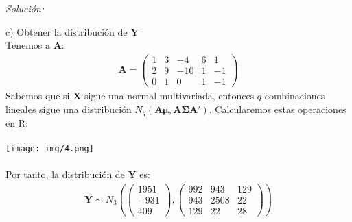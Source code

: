 \documentclass[12pt]{article}
\newenvironment{sol}
    {\emph{Solución:}
    }
    {
    }
\begin{document}
\begin{sol}
c) Obtener la distribución de $\mathbf{Y}$\\
Tenemos a $\mathbf{A}$:
\begin{align*} \mathbf{A} =
\begin{pmatrix}
1 & 3 & -4 & 6 & 1 \\
2 & 9 & -10 & 1 & -1\\
0 & 1 & 0 & 1 & -1 
\end{pmatrix}
\end{align*}
Sabemos que si $\mathbf{X}$ sigue una normal multivariada, entonces  $q$ combinaciones lineales sigue una distribución $N_q(\mathbf{A \mu , A \Sigma A'})$. Calcularemos estas operaciones en R:\\\\
\texttt{[image: img/4.png]}\\\\
Por tanto, la distribución de $\mathbf{Y}$ es:
\begin{align*}
\mathbf{Y}\sim N_3(\begin{pmatrix}
1951 \\ -931 \\ 409
\end{pmatrix}, 
\begin{pmatrix}
992 & 943 & 129 \\
943 & 2508 & 22 \\
129 & 22 & 28
\end{pmatrix})
\end{align*}

\pagebreak


\end{sol}
\end{document}
